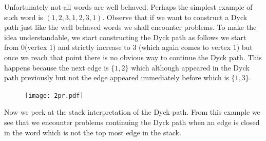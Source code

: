 \documentclass[12pt]{article}
\numberwithin{equation}{section}
\numberwithin{equation}{section}
\theoremstyle{definition}
\renewcommand{\1}{\bf 1}
\begin{document}
Unfortunately not all words are well behaved. Perhaps the simplest example of such word is $(1,2,3,1,2,3,1)$. Observe that if we want to construct a Dyck path just like the well behaved words we shall encounter problems. To make the idea understandable, we start constructing the Dyck path as follows we start from $0$(vertex $1$) and strictly increase to $3$ (which again comes to vertex $1$) but once we reach that point there is no obvious way to continue the Dyck path. This happens because the next edge is $\{ 1,2 \}$ which although appeared in the Dyck path previously but not the edge appeared immediately before which is $\{ 1,3\}$. 
\begin{figure}[H]
        \begin{center}
                \texttt{[image: 2pr.pdf]}
        ~ %
      \end{center}   
 \end{figure} 
 Now we peek at the stack interpretation of the Dyck path. From this example we see that we encounter problems continuing the Dyck path when an edge is closed in the word which is not the top most edge in the stack.
\end{document}
